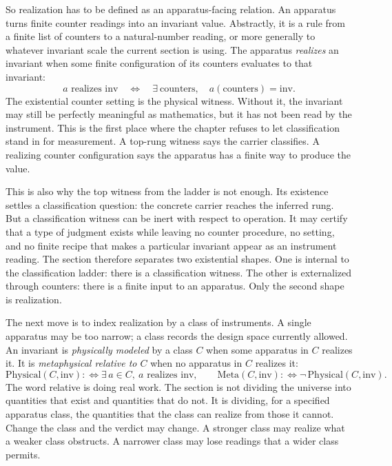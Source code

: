 So realization has to be defined as an apparatus-facing relation. An apparatus
turns finite counter readings into an invariant value. Abstractly, it is a rule
from a finite list of counters to a natural-number reading, or more generally to
whatever invariant scale the current section is using. The apparatus
\emph{realizes} an invariant when some finite configuration of its counters
evaluates to that invariant:
\[
  a \text{ realizes } \mathrm{inv}
  \quad\Longleftrightarrow\quad
  \exists\ \text{counters},\quad a(\text{counters}) = \mathrm{inv}.
\]
The existential counter setting is the physical witness. Without it, the
invariant may still be perfectly meaningful as mathematics, but it has not been
read by the instrument. This is the first place where the chapter refuses to let
classification stand in for measurement. A top-rung witness says the carrier
classifies. A realizing counter configuration says the apparatus has a finite way
to produce the value.

This is also why the top witness from the ladder is not enough. Its existence
settles a classification question: the concrete carrier reaches the inferred
rung. But a classification witness can be inert with respect to operation. It
may certify that a type of judgment exists while leaving no counter procedure, no
setting, and no finite recipe that makes a particular invariant appear as an
instrument reading. The section therefore separates two existential shapes. One
is internal to the classification ladder: there is a classification witness. The other is
externalized through counters: there is a finite input to an apparatus. Only the
second shape is realization.

The next move is to index realization by a class of instruments. A single
apparatus may be too narrow; a class records the design space currently allowed.
An invariant is \emph{physically modeled} by a class \(C\) when some apparatus
in \(C\) realizes it. It is \emph{metaphysical relative to \(C\)} when no
apparatus in \(C\) realizes it:
\[
  \mathrm{Physical}(C,\mathrm{inv})
  :\Longleftrightarrow
  \exists\, a \in C,\ a \text{ realizes } \mathrm{inv},
  \qquad
  \mathrm{Meta}(C,\mathrm{inv})
  :\Longleftrightarrow
  \neg\,\mathrm{Physical}(C,\mathrm{inv}).
\]
The word relative is doing real work. The section is not dividing the universe
into quantities that exist and quantities that do not. It is dividing, for a
specified apparatus class, the quantities that the class can realize from those
it cannot. Change the class and the verdict may change. A stronger class may
realize what a weaker class obstructs. A narrower class may lose readings that a
wider class permits.

